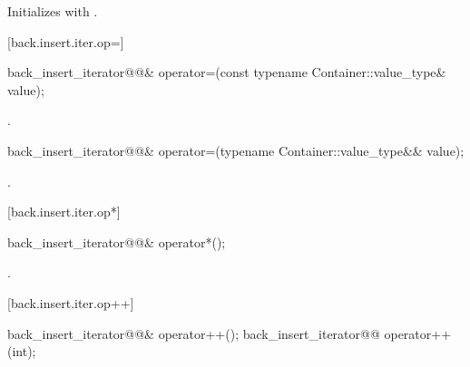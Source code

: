 \begin{itemdescr}
\pnum
\effects
Initializes
with .
\end{itemdescr}

[back.insert.iter.op=]{}

%
\begin{itemdecl}
back_insert_iterator@@&
  operator=(const typename Container::value_type& value);
\end{itemdecl}

\begin{itemdescr}
\pnum
\effects {}

\pnum
\returns
{}.
\end{itemdescr}

%
\begin{itemdecl}
back_insert_iterator@@&
  operator=(typename Container::value_type&& value);
\end{itemdecl}

\begin{itemdescr}
\pnum
\effects {}

\pnum
\returns
{}.
\end{itemdescr}

[back.insert.iter.op*]{}

%
\begin{itemdecl}
back_insert_iterator@@& operator*();
\end{itemdecl}

\begin{itemdescr}
\pnum
\returns
{}.
\end{itemdescr}

[back.insert.iter.op++]{}

%
\begin{itemdecl}
back_insert_iterator@@& operator++();
back_insert_iterator@@ operator++(int);
\end{itemdecl}

